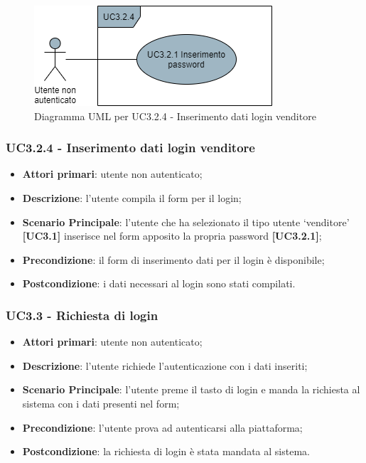 \begin{figure}[H]
\centering
\includegraphics[scale=0.6]{res/UseCase/Immagini/InserimentoDatiLoginVenditore}
\caption{Diagramma UML per UC3.2.4 - Inserimento dati login venditore}
\end{figure}

\subsubsection{UC3.2.4 - Inserimento dati login venditore}
\begin{itemize}
\item \textbf{Attori primari}: utente non autenticato;
\item \textbf{Descrizione}: l'utente compila il form per il login;
\item \textbf{Scenario Principale}: l'utente che ha selezionato il tipo utente `venditore' \textbf{[UC3.1]} inserisce nel form apposito la propria password \textbf{[UC3.2.1]};
\item \textbf{Precondizione}: il form di inserimento dati per il login è disponibile;
\item \textbf{Postcondizione}: i dati necessari al login sono stati compilati.
\end{itemize}

\subsubsection{UC3.3 - Richiesta di login}
\begin{itemize}
\item \textbf{Attori primari}: utente non autenticato;
\item \textbf{Descrizione}: l'utente richiede l'autenticazione con i dati inseriti;
\item \textbf{Scenario Principale}: l'utente preme il tasto di login e manda la richiesta al sistema con i dati presenti nel form;
\item \textbf{Precondizione}: l'utente prova ad autenticarsi alla piattaforma;
\item \textbf{Postcondizione}: la richiesta di login è stata mandata al sistema.
\end{itemize} 

